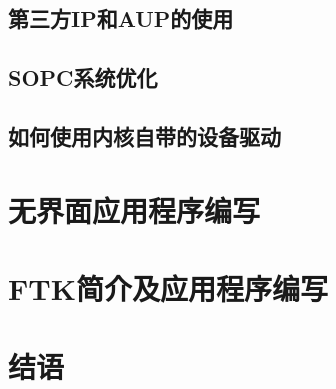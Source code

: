 \documentclass[12pt,a4paper,titlepage]{article}
\begin{document}
\subsection{第三方IP和AUP的使用}
\subsection{SOPC系统优化}
\subsection{如何使用内核自带的设备驱动}
\newpage{}
\section{无界面应用程序编写}
\newpage{}
\section{FTK简介及应用程序编写}
\newpage{}
\section{结语}
\end{document}
